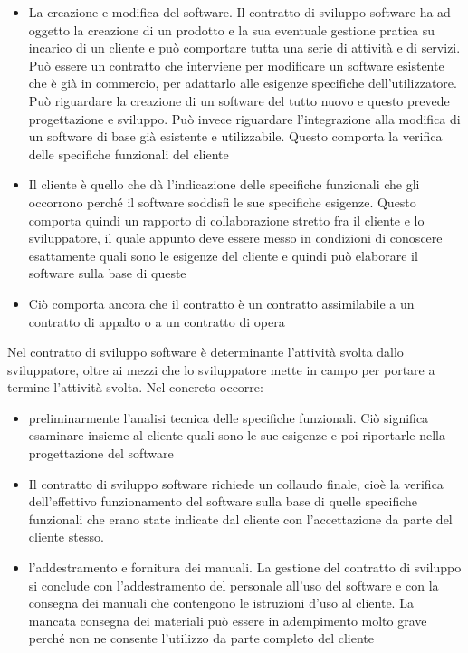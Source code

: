 \begin{itemize}
\begin{itemize}
    \item La creazione e modifica del software. Il contratto di sviluppo software ha ad oggetto la creazione di un prodotto e la sua eventuale gestione pratica su incarico di un cliente e può comportare tutta una serie di attività e di servizi. Può essere un contratto che interviene per modificare un software esistente che è già in commercio, per adattarlo alle esigenze specifiche dell'utilizzatore. Può riguardare la creazione di un software del tutto nuovo e questo prevede progettazione e sviluppo. Può invece riguardare l'integrazione alla modifica di un software di base già esistente e utilizzabile. Questo comporta la verifica delle specifiche funzionali del cliente
    \item Il cliente è quello che dà l'indicazione delle specifiche funzionali che gli occorrono perché il software soddisfi le sue specifiche esigenze. Questo comporta quindi un rapporto di collaborazione stretto fra il cliente e lo sviluppatore, il quale appunto deve essere messo in condizioni di conoscere esattamente quali sono le esigenze del cliente e quindi può elaborare il software sulla base di queste
    \item Ciò comporta ancora che il contratto è un contratto assimilabile a un contratto di appalto o a un contratto di opera
\end{itemize}

Nel contratto di sviluppo software è determinante l'attività svolta dallo sviluppatore, oltre ai mezzi che lo sviluppatore mette in campo per portare a termine l'attività svolta. 
Nel concreto occorre:

\begin{itemize}
    \item preliminarmente l'analisi tecnica delle specifiche funzionali. Ciò significa esaminare insieme al cliente quali sono le sue esigenze e poi riportarle nella progettazione del software 
    \item Il contratto di sviluppo software richiede un collaudo finale, cioè la verifica dell'effettivo funzionamento del software sulla base di quelle specifiche funzionali che erano state indicate dal cliente con l'accettazione da parte del cliente stesso.
    \item l'addestramento e fornitura dei manuali. La gestione del contratto di sviluppo si conclude con l'addestramento del personale all'uso del software e con la consegna dei manuali che contengono le istruzioni d'uso al cliente. La mancata consegna dei materiali può essere in adempimento molto grave perché non ne consente l'utilizzo da parte completo del cliente
\end{itemize}


\end{itemize}
